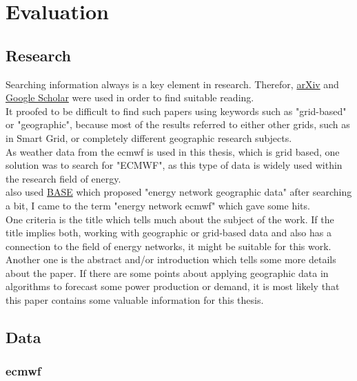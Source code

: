 \chapter{Evaluation}
\label{ch:Evaluation}

\section{Research}

Searching information always is a key element in research. Therefor, \href{arxiv.org}{arXiv} and \href{scholar.google.de}{Google Scholar} were used in order to find suitable reading.\\
It proofed to be difficult to find such papers using keywords such as "grid-based" or "geographic", because most of the results referred to either other grids, such as in Smart Grid, or completely different geographic research subjects.\\
As weather data from the \acrfull{ecmwf} is used in this thesis, which is grid based, one solution was to search for "ECMWF", as this type of data is widely used within the research field of energy.\\

also used \href{base-search.net}{BASE} which proposed "energy network geographic data" after searching a bit, I came to the term "energy network ecmwf" which gave some hits.\\
One criteria is the title which tells much about the subject of the work. If the title implies both, working with geographic or grid-based data and also has a connection to the field of energy networks, it might be suitable for this work.\\
Another one is the abstract and/or introduction which tells some more details about the paper. If there are some points about applying geographic data in algorithms to forecast some power production or demand, it is most likely that this paper contains some valuable information for this thesis.\\

\section{Data}

\subsection{\acrshort{ecmwf}}

